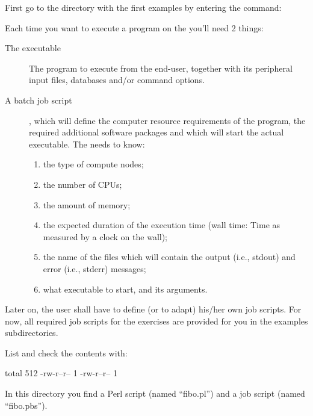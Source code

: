 \begin{prompt}
\end{prompt}

First go to the directory with the first examples by entering the command:

\begin{prompt}
\end{prompt}

Each time you want to execute a program on the \hpc you'll need 2 things:

\begin{description}
  \item[The executable] The program to execute from the end-user, together with its peripheral input files, databases and/or command options.
  \item[A batch job script], which will define the computer resource requirements of the program, the required additional software packages and which will start the actual executable.  The \hpc needs to know:
    \begin{enumerate}
      \item  the type of compute nodes;
      \item  the number of CPUs;
      \item  the amount of memory;
      \item  the expected duration of the execution time (wall time: Time as measured by a clock on the wall);
      \item  the name of the files which will contain the output (i.e., stdout) and error (i.e., stderr) messages;
      \item  what executable to start, and its arguments.
    \end{enumerate}
\end{description}

Later on, the \hpc user shall have to define (or to adapt) his/her own
job scripts. For now, all required job scripts for the
exercises are provided for you in the examples subdirectories.

List and check the contents with:

\begin{prompt}
total 512
-rw-r--r-- 1 %
-rw-r--r-- 1 %
\end{prompt}

In this directory you find a Perl script (named ``fibo.pl'') and a job script
(named ``fibo.pbs'').

